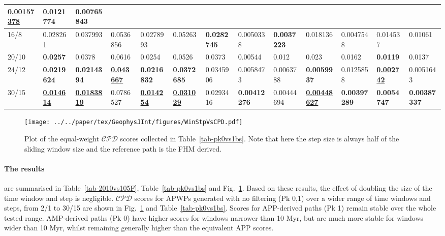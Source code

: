 \begin{landscape}
\begin{table*}
{\begin{tabular}{|l|l|l|l|l|l|l|l|l|l|l|l|l|}
  {\color[HTML]{009901} {\ul\textbf{0.00157378}}} & 0.0121774 & 0.00765843 \\ \hline
16/8 & 0.028261 & 0.037993 & 0.0536856 & 0.0278993 & 0.05263 &
  {\color[HTML]{34FF34} \textbf{0.0282745}} & 0.0050338 & {\color[HTML]{32CB00}
  \textbf{0.0037223}} & 0.018136 & 0.0047548 & 0.014537 & 0.01061 \\ \hline
20/10 & {\color[HTML]{34FF34} \textbf{0.0257}} & 0.0378 & 0.0616 &
  0.0254 & 0.0526 & 0.0373 & 0.00544 & 0.012 &
  0.023 & 0.0162 & {\color[HTML]{34FF34} \textbf{0.0119}} & 0.0137 \\ \hline
24/12 & {\color[HTML]{32CB00} \textbf{0.0219624}} & {\color[HTML]{32CB00}
  \textbf{0.0214394}} & {\color[HTML]{009901} {\ul\textbf{0.043667}}} &
  {\color[HTML]{32CB00} \textbf{0.0216832}} & {\color[HTML]{32CB00}
  \textbf{0.0372685}} & 0.0345906 & 0.0058473 & 0.0063788 &
  {\color[HTML]{32CB00} \textbf{0.0059937}} & 0.0125858 &
  {\color[HTML]{009901} {\ul\textbf{0.002742}}} & 0.0051643 \\ \hline
30/15 & {\color[HTML]{009901} {\ul\textbf{0.014614}}} & {\color[HTML]{009901}
  {\ul\textbf{0.0183819}}} & 0.0786527 & {\color[HTML]{009901} {\ul\textbf{0.014254}}} & {\color[HTML]{009901} {\ul\textbf{0.031029}}} &
  0.0293416 & {\color[HTML]{34FF34} \textbf{0.00412276}} &
  0.00444694 & {\color[HTML]{009901} {\ul\textbf{0.00448627}}} & {\color[HTML]{32CB00} \textbf{0.00397289}} &
  {\color[HTML]{32CB00} \textbf{0.0054747}} & {\color[HTML]{32CB00}
  \textbf{0.00387337}} \\ \hline
\end{tabular}%
}
\end{table*}
\end{landscape}

\begin{figure}[!ht]
\centering
\texttt{[image: ../../paper/tex/GeophysJInt/figures/WinStpVsCPD.pdf]}
\caption[Sliding window and step sizes vs $\mathcal{CPD}$]{Plot of the
equal-weight $\mathcal{CPD}$ scores collected in Table~\ref{tab-pk0vs1bs}. Note
that here the step size is always half of the sliding window size and the
reference path is the FHM derived.}\label{fig-WinStpVsCPD}
\end{figure}

\paragraph{The results}
are summarised in Table~\ref{tab-2010vs105F}, Table~\ref{tab-pk0vs1bs} and
Fig.~\ref{fig-WinStpVsCPD}. Based on these results, the effect of doubling the
size of the time window and step is negligible. $\mathcal{CPD}$ scores for APWPs
generated with no filtering (Pk 0,1) over a wider range of time windows and
steps, from 2/1 to 30/15 are shown in Fig.~\ref{fig-WinStpVsCPD} and
Table~\ref{tab-pk0vs1bs}. Scores for APP-derived paths (Pk 1) remain stable over
the whole tested range. AMP-derived paths (Pk 0) have higher scores for windows
narrower than 10 Myr, but are much more stable for windows wider than
10 Myr, whilst remaining generally higher than the equivalent APP
scores.



